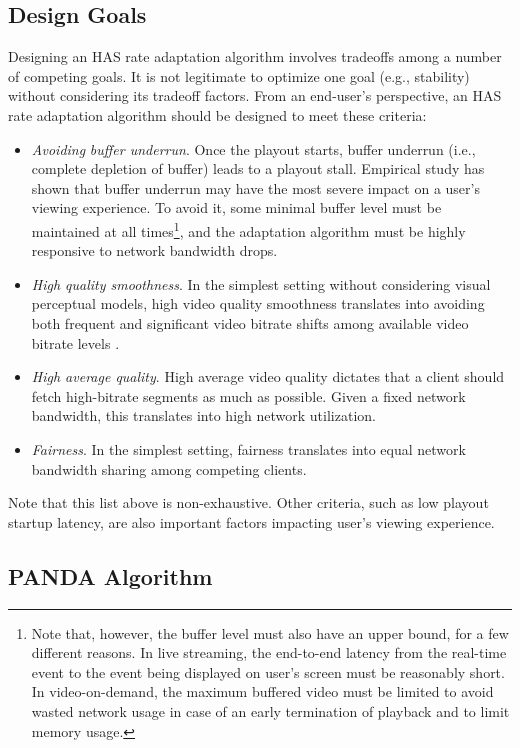 \documentclass[conference]{IEEEtran}
\theoremstyle{plain}
\theoremstyle{definition}
\theoremstyle{plain}
\theoremstyle{plain}
\begin{document}
\subsection{Design Goals\label{sec:Goals}}

Designing an HAS rate adaptation algorithm involves tradeoffs among
a number of competing goals. It is not legitimate to optimize one
goal (e.g., stability) without considering its tradeoff factors. From
an end-user's perspective, an HAS rate adaptation algorithm should
be designed to meet these criteria:
\begin{itemize}
\item \emph{Avoiding} \emph{buffer underrun}. Once the playout starts, buffer
underrun (i.e., complete depletion of buffer) leads to a playout stall.
Empirical study \cite{zhanghui2011} has shown that buffer underrun
may have the most severe impact on a user's viewing experience. To
avoid it, some minimal buffer level must be maintained at all times\footnote{Note that, however, the buffer level must also have an upper bound,
for a few different reasons. In live streaming, the end-to-end latency
from the real-time event to the event being displayed on user's screen
must be reasonably short. In video-on-demand, the maximum buffered
video must be limited to avoid wasted network usage in case of an
early termination of playback and to limit memory usage.}, and the adaptation algorithm must be highly responsive to network
bandwidth drops.
\item \emph{High quality smoothness}. In the simplest setting without considering
visual perceptual models, high video quality smoothness translates
into avoiding both frequent and significant video bitrate shifts among
available video bitrate levels \cite{Jiang:CoNext12,Mok:WMUST2011}. 
\item \emph{High average quality}. High average video quality dictates that
a client should fetch high-bitrate segments as much as possible. Given
a fixed network bandwidth, this translates into high network utilization.
\item \emph{Fairness}. In the simplest setting, fairness translates into
equal network bandwidth sharing among competing clients. 
\end{itemize}
Note that this list above is non-exhaustive. Other criteria, such
as low playout startup latency, are also important factors impacting
user's viewing experience.


\subsection{PANDA Algorithm}
\end{document}
